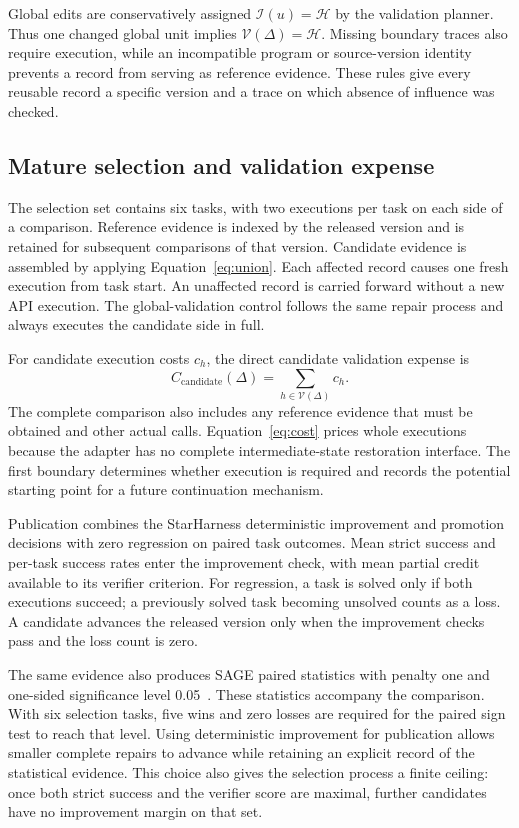 \documentclass{ecai}
\begin{document}
Global edits are conservatively assigned $\mathcal I(u)=\mathcal H$ by the validation planner. Thus one changed global unit implies $\mathcal V(\Delta)=\mathcal H$. Missing boundary traces also require execution, while an incompatible program or source-version identity prevents a record from serving as reference evidence. These rules give every reusable record a specific version and a trace on which absence of influence was checked.

\subsection{Mature selection and validation expense}
\label{sec:selection}

The selection set contains six tasks, with two executions per task on each side of a comparison. Reference evidence is indexed by the released version and is retained for subsequent comparisons of that version. Candidate evidence is assembled by applying Equation~\eqref{eq:union}. Each affected record causes one fresh execution from task start. An unaffected record is carried forward without a new API execution. The global-validation control follows the same repair process and always executes the candidate side in full.

For candidate execution costs $c_h$, the direct candidate validation expense is
\begin{equation}
C_{\mathrm{candidate}}(\Delta)=\sum_{h\in\mathcal V(\Delta)}c_h.
\label{eq:cost}
\end{equation}
The complete comparison also includes any reference evidence that must be obtained and other actual calls. Equation~\eqref{eq:cost} prices whole executions because the adapter has no complete intermediate-state restoration interface. The first boundary determines whether execution is required and records the potential starting point for a future continuation mechanism.

Publication combines the StarHarness deterministic improvement and promotion decisions with zero regression on paired task outcomes. Mean strict success and per-task success rates enter the improvement check, with mean partial credit available to its verifier criterion. For regression, a task is solved only if both executions succeed; a previously solved task becoming unsolved counts as a loss. A candidate advances the released version only when the improvement checks pass and the loss count is zero.

The same evidence also produces SAGE paired statistics with penalty one and one-sided significance level 0.05~\cite{sage}. These statistics accompany the comparison. With six selection tasks, five wins and zero losses are required for the paired sign test to reach that level. Using deterministic improvement for publication allows smaller complete repairs to advance while retaining an explicit record of the statistical evidence. This choice also gives the selection process a finite ceiling: once both strict success and the verifier score are maximal, further candidates have no improvement margin on that set.
\end{document}
